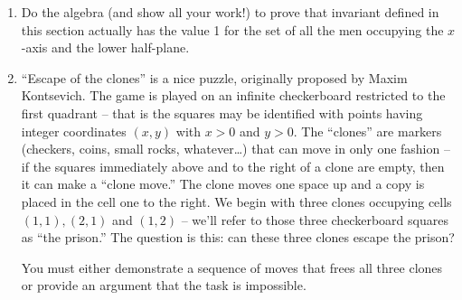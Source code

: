 \begin{enumerate}
\item Do the algebra (and show all your work!) to prove that invariant
defined in this section actually has the value 1 for the set of all the
men occupying the $x$-axis and the lower half-plane.

\wbvfill

\workbookpagebreak

\item ``Escape of the clones'' is a  nice puzzle, originally proposed by Maxim Kontsevich.  The game
is played on an infinite checkerboard restricted to the first quadrant -- that is the squares may be 
identified with points having integer coordinates $(x,y)$ with $x>0$ and $y>0$.  The ``clones'' are markers
(checkers, coins, small rocks, whatever\ldots) that can move in only one fashion -- if the squares immediately
above and to the right of a clone are empty, then it can make a ``clone move.''   The clone moves one space
up and a copy is placed in the cell one to the right.  We begin with three clones occupying cells $(1,1), (2,1)$ and $(1,2)$ -- we'll refer to those three checkerboard squares as ``the prison.''  The question is this:  can these
three clones escape the prison?

You must either demonstrate a sequence of moves that frees all three clones or provide an argument that the task is impossible.

\wbvfill

\end{enumerate}


